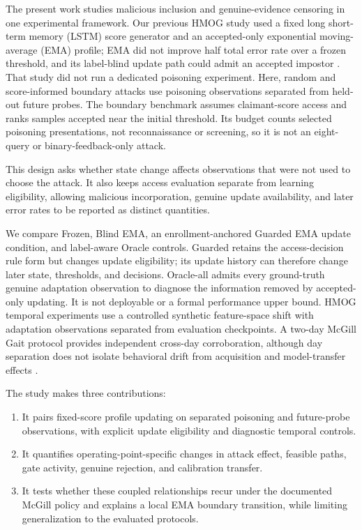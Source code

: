 \documentclass[technologies,article,submit,moreauthors]{Definitions/mdpi}
\begin{document}
The present work studies malicious inclusion and genuine-evidence censoring in one experimental framework. Our previous HMOG study used a fixed long short-term memory (LSTM) score generator and an accepted-only exponential moving-average (EMA) profile; EMA did not improve half total error rate over a frozen threshold, and its label-blind update path could admit an accepted impostor \cite{Serbin2026AdaptiveLSTM}. That study did not run a dedicated poisoning experiment. Here, random and score-informed boundary attacks use poisoning observations separated from held-out future probes. The boundary benchmark assumes claimant-score access and ranks samples accepted near the initial threshold. Its budget counts selected poisoning presentations, not reconnaissance or screening, so it is not an eight-query or binary-feedback-only attack.

This design asks whether state change affects observations that were not used to choose the attack. It also keeps access evaluation separate from learning eligibility, allowing malicious incorporation, genuine update availability, and later error rates to be reported as distinct quantities.

We compare Frozen, Blind EMA, an enrollment-anchored Guarded EMA update condition, and label-aware Oracle controls. Guarded retains the access-decision rule form but changes update eligibility; its update history can therefore change later state, thresholds, and decisions. Oracle-all admits every ground-truth genuine adaptation observation to diagnose the information removed by accepted-only updating. It is not deployable or a formal performance upper bound. HMOG temporal experiments use a controlled synthetic feature-space shift with adaptation observations separated from evaluation checkpoints. A two-day McGill Gait protocol provides independent cross-day corroboration, although day separation does not isolate behavioral drift from acquisition and model-transfer effects \cite{Frank2010McGillGaitDataset}.

The study makes three contributions:

\begin{enumerate}
\def\labelenumi{\arabic{enumi}.}
\item
  It pairs fixed-score profile updating on separated poisoning and future-probe observations, with explicit update eligibility and diagnostic temporal controls.
\item
  It quantifies operating-point-specific changes in attack effect, feasible paths, gate activity, genuine rejection, and calibration transfer.
\item
  It tests whether these coupled relationships recur under the documented McGill policy and explains a local EMA boundary transition, while limiting generalization to the evaluated protocols.
\end{enumerate}
\end{document}
